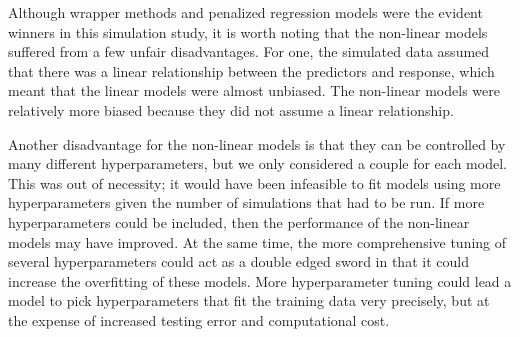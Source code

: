 \documentclass{article}
\begin{document}

Although wrapper methods and penalized regression models were the evident winners in this simulation study, it is worth noting that the non-linear models suffered from a few unfair disadvantages. For one, the simulated data assumed that there was a linear relationship between the predictors and response, which meant that the linear models were almost unbiased. The non-linear models were relatively more biased because they did not assume a linear relationship. 

Another disadvantage for the non-linear models is that they can be controlled by many different hyperparameters, but we only considered a couple for each model. This was out of necessity; it would have been infeasible to fit models using more hyperparameters given the number of simulations that had to be run. If more hyperparameters could be included, then the performance of the non-linear models may have improved. At the same time, the more comprehensive tuning of several hyperparameters could act as a double edged sword in that it could increase the overfitting of these models. More hyperparameter tuning could lead a model to pick hyperparameters that fit the training data very precisely, but at the expense of increased testing error and computational cost.
\end{document}
